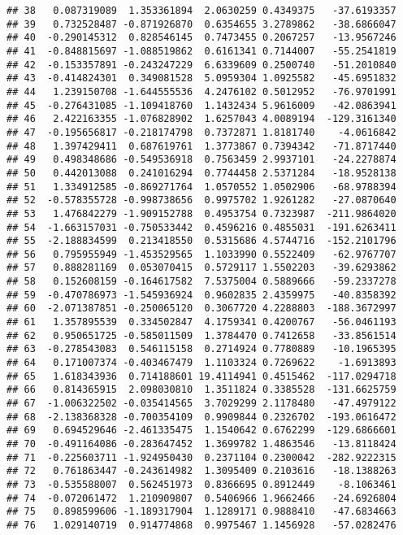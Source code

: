 \documentclass[
]{article}
\begin{document}
\begin{verbatim}
## 38   0.087319089  1.353361894  2.0630259 0.4349375   -37.6193357
## 39   0.732528487 -0.871926870  0.6354655 3.2789862   -38.6866047
## 40  -0.290145312  0.828546145  0.7473455 0.2067257   -13.9567246
## 41  -0.848815697 -1.088519862  0.6161341 0.7144007   -55.2541819
## 42  -0.153357891 -0.243247229  6.6339609 0.2500740   -51.2010840
## 43  -0.414824301  0.349081528  5.0959304 1.0925582   -45.6951832
## 44   1.239150708 -1.644555536  4.2476102 0.5012952   -76.9701991
## 45  -0.276431085 -1.109418760  1.1432434 5.9616009   -42.0863941
## 46   2.422163355 -1.076828902  1.6257043 4.0089194  -129.3161340
## 47  -0.195656817 -0.218174798  0.7372871 1.8181740    -4.0616842
## 48   1.397429411  0.687619761  1.3773867 0.7394342   -71.8717440
## 49   0.498348686 -0.549536918  0.7563459 2.9937101   -24.2278874
## 50   0.442013088  0.241016294  0.7744458 2.5371284   -18.9528138
## 51   1.334912585 -0.869271764  1.0570552 1.0502906   -68.9788394
## 52  -0.578355728 -0.998738656  0.9975702 1.9261282   -27.0870640
## 53   1.476842279 -1.909152788  0.4953754 0.7323987  -211.9864020
## 54  -1.663157031 -0.750533442  0.4596216 0.4855031  -191.6263411
## 55  -2.188834599  0.213418550  0.5315686 4.5744716  -152.2101796
## 56   0.795955949 -1.453529565  1.1033990 0.5522409   -62.9767707
## 57   0.888281169  0.053070415  0.5729117 1.5502203   -39.6293862
## 58   0.152608159 -0.164617582  7.5375004 0.5889666   -59.2337278
## 59  -0.470786973 -1.545936924  0.9602835 2.4359975   -40.8358392
## 60  -2.071387851 -0.250065120  0.3067720 4.2288803  -188.3672997
## 61   1.357895539  0.334502847  4.1759341 0.4200767   -56.0461193
## 62   0.950651725 -0.585011509  1.3784470 0.7412658   -33.8561514
## 63  -0.278543083  0.546115158  0.2714924 0.7780889   -10.1965395
## 64   0.171007374 -0.403467479  1.1103324 0.7269622    -1.6913893
## 65   1.618343936  0.714188601 19.4114941 0.4515462  -117.0294718
## 66   0.814365915  2.098030810  1.3511824 0.3385528  -131.6625759
## 67  -1.006322502 -0.035414565  3.7029299 2.1178480   -47.4979122
## 68  -2.138368328 -0.700354109  0.9909844 0.2326702  -193.0616472
## 69   0.694529646 -2.461335475  1.1540642 0.6762299  -129.6866601
## 70  -0.491164086 -0.283647452  1.3699782 1.4863546   -13.8118424
## 71  -0.225603711 -1.924950430  0.2371104 0.2300042  -282.9222315
## 72   0.761863447 -0.243614982  1.3095409 0.2103616   -18.1388263
## 73  -0.535588007  0.562451973  0.8366695 0.8912449    -8.1063461
## 74  -0.072061472  1.210909807  0.5406966 1.9662466   -24.6926804
## 75   0.898599606 -1.189317904  1.1289171 0.9888410   -47.6834663
## 76   1.029140719  0.914774868  0.9975467 1.1456928   -57.0282476

\end{verbatim}
\end{document}
